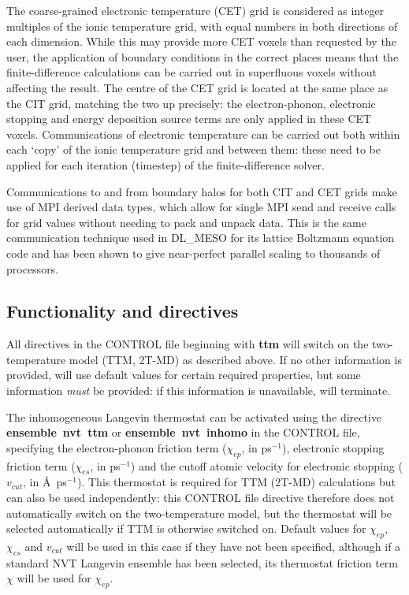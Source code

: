 The coarse-grained electronic temperature (CET) grid is considered as 
integer multiples of the ionic temperature grid, with equal numbers in both 
directions of each dimension. While this may provide more CET voxels than 
requested by the user, the application of boundary conditions in the correct
places means that the finite-difference calculations can be carried out in 
superfluous voxels without affecting the result. The centre of the CET grid is 
located at the same place as the CIT grid, matching the two up precisely: the 
electron-phonon, electronic stopping and energy deposition source terms are 
only applied in these CET voxels. Communications of electronic temperature 
can be carried out both within each `copy' of the ionic temperature grid and 
between them: these need to be applied for each iteration (timestep) of the 
finite-difference solver.

Communications to and from boundary halos for both CIT and CET grids 
make use of MPI derived data types, which allow for single MPI send and 
receive calls for grid values without needing to pack and unpack data. This 
is the same communication technique used in DL\_MESO for its lattice 
Boltzmann equation code\cite{seaton-13a} and has been shown to give 
near-perfect parallel scaling to thousands of processors.

\subsection*{Functionality and directives}

All directives in the CONTROL file beginning with {\bf ttm} will switch on 
the two-temperature model (TTM, 2T-MD) as described above. If no other 
information is provided, \D will use default values for certain required 
properties, but some information {\em must} be provided: if this information 
is unavailable, \D will terminate.

The inhomogeneous Langevin thermostat can be activated using the 
directive {\bf ensemble~nvt~ttm} or {\bf ensemble~nvt~inhomo} in the 
CONTROL file, specifying the electron-phonon friction term ($\chi_{ep}$, 
in ps$^{-1}$), electronic stopping friction term ($\chi_{es}$, in ps$^{-1}$) 
and the cutoff atomic velocity for electronic stopping ($v_{cut}$, in 
\AA~ps$^{-1}$). This thermostat is required for TTM (2T-MD) calculations 
but can also be used independently: this CONTROL file directive therefore 
does not automatically switch on the two-temperature model, but the 
thermostat will be selected automatically if TTM is otherwise switched on. 
Default values for $\chi_{ep}$, $\chi_{es}$ and $v_{cut}$ will be used in this 
case if they have not been specified, although if a standard NVT Langevin 
ensemble has been selected, its thermostat friction term $\chi$ will be used 
for $\chi_{ep}$.

